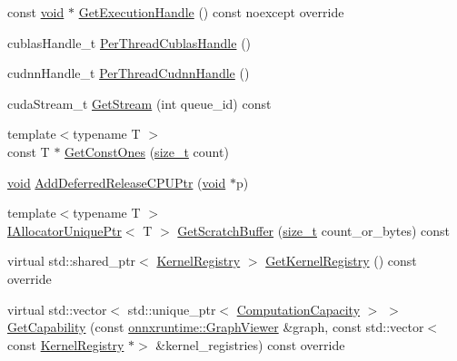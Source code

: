 \begin{DoxyCompactItemize}
\item 
const \mbox{\hyperlink{mlasi_8h_a88f941d423cb2a819b70a1358982b1a6}{void}} $\ast$ \mbox{\hyperlink{classonnxruntime_1_1CUDAExecutionProvider_a1cf09f277e0559c0e864fa6b0d39c898}{Get\+Execution\+Handle}} () const noexcept override
\item 
cublas\+Handle\+\_\+t \mbox{\hyperlink{classonnxruntime_1_1CUDAExecutionProvider_a3f8178414579cf4207dd34afc75438f6}{Per\+Thread\+Cublas\+Handle}} ()
\item 
cudnn\+Handle\+\_\+t \mbox{\hyperlink{classonnxruntime_1_1CUDAExecutionProvider_a9e4e2ca076bb0fa560eac0bd88ab27fa}{Per\+Thread\+Cudnn\+Handle}} ()
\item 
cuda\+Stream\+\_\+t \mbox{\hyperlink{classonnxruntime_1_1CUDAExecutionProvider_ac97b455cec41500ac347f375ece13c1e}{Get\+Stream}} (int queue\+\_\+id) const
\item 
{\footnotesize template$<$typename T $>$ }\\const T $\ast$ \mbox{\hyperlink{classonnxruntime_1_1CUDAExecutionProvider_a76dc7ab7a7a58043697a83cb6c69be2e}{Get\+Const\+Ones}} (\mbox{\hyperlink{mlasi_8h_a503efbc1c6e50825320ad909366b78ab}{size\+\_\+t}} count)
\item 
\mbox{\hyperlink{mlasi_8h_a88f941d423cb2a819b70a1358982b1a6}{void}} \mbox{\hyperlink{classonnxruntime_1_1CUDAExecutionProvider_a37a6f28d78d81de1c903464b78a8744a}{Add\+Deferred\+Release\+C\+P\+U\+Ptr}} (\mbox{\hyperlink{mlasi_8h_a88f941d423cb2a819b70a1358982b1a6}{void}} $\ast$p)
\item 
{\footnotesize template$<$typename T $>$ }\\\mbox{\hyperlink{namespaceonnxruntime_a323aace024f171700e4b07b299a178e7}{I\+Allocator\+Unique\+Ptr}}$<$ T $>$ \mbox{\hyperlink{classonnxruntime_1_1CUDAExecutionProvider_a850dd443cf0b9e0d280fd342ef399696}{Get\+Scratch\+Buffer}} (\mbox{\hyperlink{mlasi_8h_a503efbc1c6e50825320ad909366b78ab}{size\+\_\+t}} count\+\_\+or\+\_\+bytes) const
\item 
virtual std\+::shared\+\_\+ptr$<$ \mbox{\hyperlink{classonnxruntime_1_1KernelRegistry}{Kernel\+Registry}} $>$ \mbox{\hyperlink{classonnxruntime_1_1CUDAExecutionProvider_a771c4dbe04b51b0c019e8b0e4648f61c}{Get\+Kernel\+Registry}} () const override
\item 
virtual std\+::vector$<$ std\+::unique\+\_\+ptr$<$ \mbox{\hyperlink{structonnxruntime_1_1ComputationCapacity}{Computation\+Capacity}} $>$ $>$ \mbox{\hyperlink{classonnxruntime_1_1CUDAExecutionProvider_a1bb04dae34303befc1db6b487dc4c7c5}{Get\+Capability}} (const \mbox{\hyperlink{classonnxruntime_1_1GraphViewer}{onnxruntime\+::\+Graph\+Viewer}} \&graph, const std\+::vector$<$ const \mbox{\hyperlink{classonnxruntime_1_1KernelRegistry}{Kernel\+Registry}} $\ast$$>$ \&kernel\+\_\+registries) const override
\end{DoxyCompactItemize}


